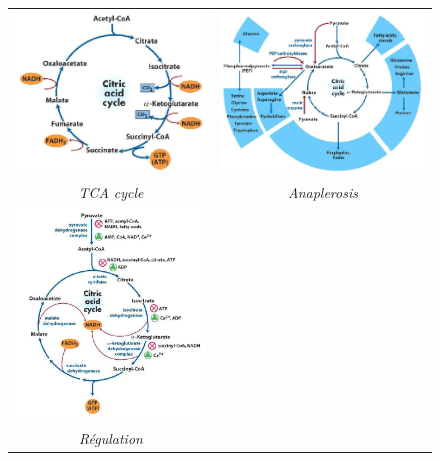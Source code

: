 \begin{figure}
    \centering
    \begin{tabular}{cc}
        \includegraphics[width =8 cm]{Images/5.PNG}    &   \includegraphics[width =8 cm]{Images/6.PNG} \\
        \textit{TCA cycle}     &   \textit{Anaplerosis} \\
        \includegraphics[width =8 cm]{Images/7.PNG}    & \\
        \textit{Régulation}    & \\
    \end{tabular}
\end{figure}


